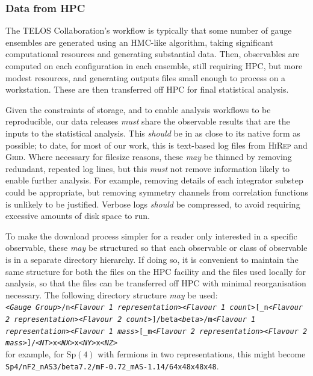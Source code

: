 \documentclass{article}
\newcommand\rfcword[1]{\emph{#1}\xspace}
\newcommand\must{\rfcword{must}}
\newcommand\should{\rfcword{should}}
\newcommand\may{\rfcword{may}}
\newcommand\program[1]{\textsc{#1}\xspace}
\begin{document}
\subsubsection{Data from HPC}\label{sec:dr-from-hpc}

The TELOS Collaboration's workflow is typically that
some number of gauge ensembles are generated using an HMC-like algorithm,
taking significant computational resources
and generating substantial data.
Then,
observables are computed on each configuration in each ensemble,
still requiring HPC,
but more modest resources,
and generating outputs files small enough to process on a workstation.
These are then transferred off HPC for final statistical analysis.

Given the constraints of storage,
and to enable analysis workflows to be reproducible,
our data releases \must
share the observable results that are the inputs to the statistical analysis.
This \should be in as close to its native form as possible;
to date,
for most of our work,
this is text-based log files from \program{HiRep} and \program{Grid}.
Where necessary for filesize reasons,
these \may be thinned by removing redundant, repeated log lines,
but this \must not remove information likely to enable further analysis.
For example,
removing details of each integrator substep could be appropriate,
but removing symmetry channels from correlation functions is unlikely to be justified.
Verbose logs \should be compressed,
to avoid requiring excessive amounts of disk space to run.

To make the download process simpler for a reader only interested in a specific observable,
these \may be structured so that
each observable or class of observable
is in a separate directory hierarchy.
If doing so,
it is convenient to maintain the same structure for both
the files on the HPC facility
and the files used locally for analysis,
so that the files can be transferred off HPC with minimal reorganisation necessary.
The following directory structure \may be used:
\\
\texttt{\emph{<Gauge Group>}/n\emph{<Flavour 1 representation><Flavour 1 count>}[\_n\emph{<Flavour 2 representation><Flavour 2 count>}]/beta\emph{<beta>}/m\emph{<Flavour 1 representation><Flavour 1 mass>}[\_m\emph{<Flavour 2 representation><Flavour 2 mass>}]/\emph{<NT>}x\emph{<NX>}x\emph{<NY>}x\emph{<NZ>}}\\
for example,
for $\mathrm{Sp}(4)$ with fermions in two representations,
this might become\\
\texttt{Sp4/nF2\_nAS3/beta7.2/mF-0.72\_mAS-1.14/64x48x48x48}.
\end{document}
